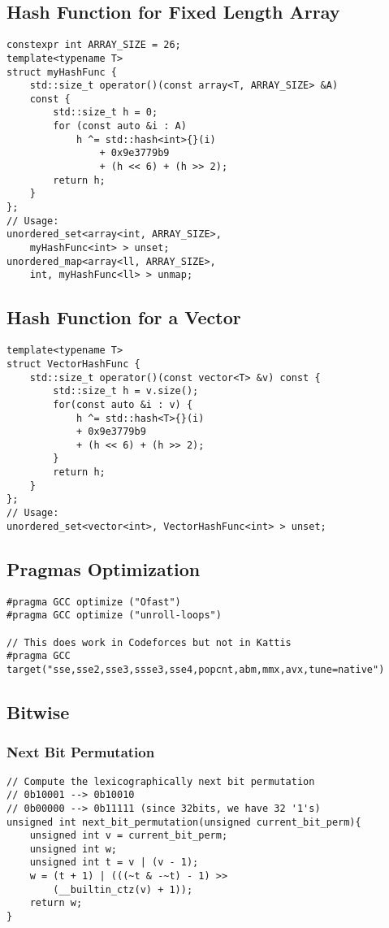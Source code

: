 \documentclass[10pt]{article}{\twocolumn}
\begin{document}
\subsection{Hash Function for Fixed Length Array}
\begin{lstlisting}
constexpr int ARRAY_SIZE = 26;
template<typename T>
struct myHashFunc {
    std::size_t operator()(const array<T, ARRAY_SIZE> &A) 
    const {
        std::size_t h = 0;
        for (const auto &i : A)
            h ^= std::hash<int>{}(i) 
                + 0x9e3779b9 
                + (h << 6) + (h >> 2);
        return h;
    }
};
// Usage:
unordered_set<array<int, ARRAY_SIZE>, 
    myHashFunc<int> > unset;
unordered_map<array<ll, ARRAY_SIZE>, 
    int, myHashFunc<ll> > unmap;
\end{lstlisting}
\subsection{Hash Function for a Vector}
\begin{lstlisting}
template<typename T>
struct VectorHashFunc {
    std::size_t operator()(const vector<T> &v) const {
        std::size_t h = v.size();
        for(const auto &i : v) {
            h ^= std::hash<T>{}(i) 
            + 0x9e3779b9 
            + (h << 6) + (h >> 2);
        }
        return h;
    }
};
// Usage:
unordered_set<vector<int>, VectorHashFunc<int> > unset;
\end{lstlisting}

\subsection{Pragmas Optimization}
\begin{lstlisting}
#pragma GCC optimize ("Ofast")
#pragma GCC optimize ("unroll-loops")

// This does work in Codeforces but not in Kattis
#pragma GCC target("sse,sse2,sse3,ssse3,sse4,popcnt,abm,mmx,avx,tune=native")
\end{lstlisting}
\subsection{Bitwise}
\subsubsection{Next Bit Permutation}
\begin{lstlisting}
// Compute the lexicographically next bit permutation
// 0b10001 --> 0b10010
// 0b00000 --> 0b11111 (since 32bits, we have 32 '1's)
unsigned int next_bit_permutation(unsigned current_bit_perm){
    unsigned int v = current_bit_perm;
    unsigned int w;
    unsigned int t = v | (v - 1);
    w = (t + 1) | (((~t & -~t) - 1) >> 
        (__builtin_ctz(v) + 1));
    return w;
}
\end{lstlisting}
\end{document}
